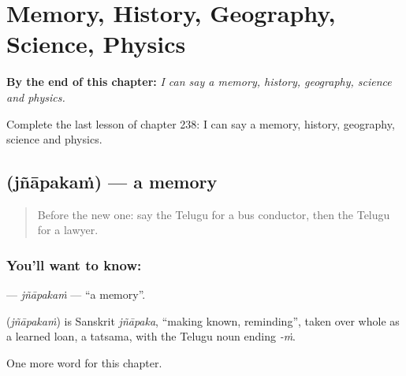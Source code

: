 
\chapter{Memory, History, Geography, Science, Physics}
\label{ch:te-memory-history-geography-science-physics}

\begin{chapteropening}
\textbf{By the end of this chapter:} \emph{I can say a memory, history, geography, science and physics.}

Complete the last lesson of chapter 238: I can say a memory, history, geography, science and physics.
\end{chapteropening}

\section[\texorpdfstring{\te{జ్ఞాపకం} (jñāpakaṁ)}{జ్ఞాపకం (jñāpakaṁ)}]{ (jñāpakaṁ) — a memory}

\label{lesson:TE-C238-jnapakam}



\begin{quote}
Before the new one: say the Telugu for a bus conductor, then the Telugu for a lawyer.
\end{quote}

\subsection*{You'll want to know: }
\textbf{} — \emph{jñāpakaṁ} — \textquotedblleft{}a memory\textquotedblright{}.

\begin{cousinweb}
\textbf{} (\emph{jñāpakaṁ}) is Sanskrit \emph{jñāpaka}, \textquotedblleft{}making known, reminding\textquotedblright{}, taken over whole as a learned loan, a tatsama, with the Telugu noun ending \emph{-ṁ}.
\end{cousinweb}

\begin{grammarlens}[title={What you've built}]
One more word for this chapter.
\end{grammarlens}

